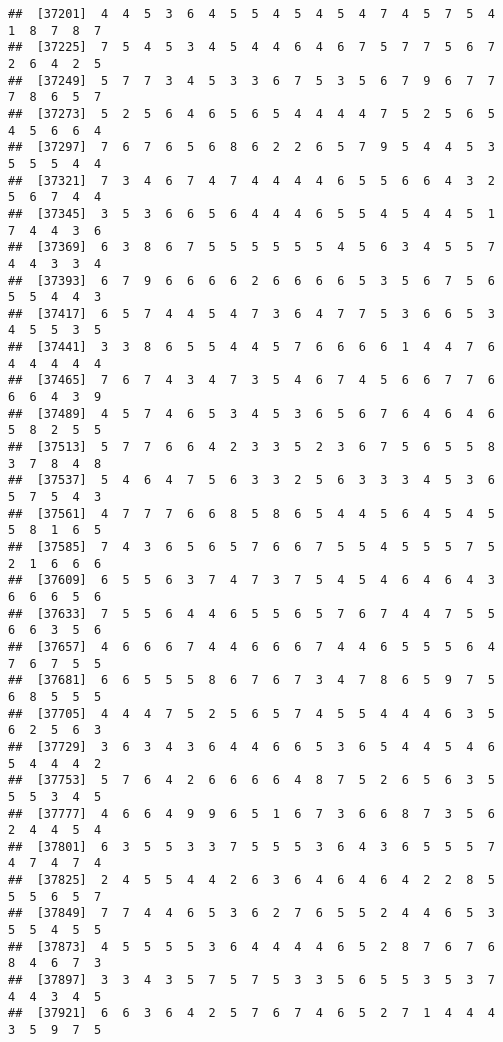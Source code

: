 \documentclass[
]{book}
\begin{document}
\begin{verbatim}
##  [37201]  4  4  5  3  6  4  5  5  4  5  4  5  4  7  4  5  7  5  4  1  8  7  8  7
##  [37225]  7  5  4  5  3  4  5  4  4  6  4  6  7  5  7  7  5  6  7  2  6  4  2  5
##  [37249]  5  7  7  3  4  5  3  3  6  7  5  3  5  6  7  9  6  7  7  7  8  6  5  7
##  [37273]  5  2  5  6  4  6  5  6  5  4  4  4  4  7  5  2  5  6  5  4  5  6  6  4
##  [37297]  7  6  7  6  5  6  8  6  2  2  6  5  7  9  5  4  4  5  3  5  5  5  4  4
##  [37321]  7  3  4  6  7  4  7  4  4  4  4  6  5  5  6  6  4  3  2  5  6  7  4  4
##  [37345]  3  5  3  6  6  5  6  4  4  4  6  5  5  4  5  4  4  5  1  7  4  4  3  6
##  [37369]  6  3  8  6  7  5  5  5  5  5  5  4  5  6  3  4  5  5  7  4  4  3  3  4
##  [37393]  6  7  9  6  6  6  6  2  6  6  6  6  5  3  5  6  7  5  6  5  5  4  4  3
##  [37417]  6  5  7  4  4  5  4  7  3  6  4  7  7  5  3  6  6  5  3  4  5  5  3  5
##  [37441]  3  3  8  6  5  5  4  4  5  7  6  6  6  6  1  4  4  7  6  4  4  4  4  4
##  [37465]  7  6  7  4  3  4  7  3  5  4  6  7  4  5  6  6  7  7  6  6  6  4  3  9
##  [37489]  4  5  7  4  6  5  3  4  5  3  6  5  6  7  6  4  6  4  6  5  8  2  5  5
##  [37513]  5  7  7  6  6  4  2  3  3  5  2  3  6  7  5  6  5  5  8  3  7  8  4  8
##  [37537]  5  4  6  4  7  5  6  3  3  2  5  6  3  3  3  4  5  3  6  5  7  5  4  3
##  [37561]  4  7  7  7  6  6  8  5  8  6  5  4  4  5  6  4  5  4  5  5  8  1  6  5
##  [37585]  7  4  3  6  5  6  5  7  6  6  7  5  5  4  5  5  5  7  5  2  1  6  6  6
##  [37609]  6  5  5  6  3  7  4  7  3  7  5  4  5  4  6  4  6  4  3  6  6  6  5  6
##  [37633]  7  5  5  6  4  4  6  5  5  6  5  7  6  7  4  4  7  5  5  6  6  3  5  6
##  [37657]  4  6  6  6  7  4  4  6  6  6  7  4  4  6  5  5  5  6  4  7  6  7  5  5
##  [37681]  6  6  5  5  5  8  6  7  6  7  3  4  7  8  6  5  9  7  5  6  8  5  5  5
##  [37705]  4  4  4  7  5  2  5  6  5  7  4  5  5  4  4  4  6  3  5  6  2  5  6  3
##  [37729]  3  6  3  4  3  6  4  4  6  6  5  3  6  5  4  4  5  4  6  5  4  4  4  2
##  [37753]  5  7  6  4  2  6  6  6  6  4  8  7  5  2  6  5  6  3  5  5  5  3  4  5
##  [37777]  4  6  6  4  9  9  6  5  1  6  7  3  6  6  8  7  3  5  6  2  4  4  5  4
##  [37801]  6  3  5  5  3  3  7  5  5  5  3  6  4  3  6  5  5  5  7  4  7  4  7  4
##  [37825]  2  4  5  5  4  4  2  6  3  6  4  6  4  6  4  2  2  8  5  5  5  6  5  7
##  [37849]  7  7  4  4  6  5  3  6  2  7  6  5  5  2  4  4  6  5  3  5  5  4  5  5
##  [37873]  4  5  5  5  5  3  6  4  4  4  4  6  5  2  8  7  6  7  6  8  4  6  7  3
##  [37897]  3  3  4  3  5  7  5  7  5  3  3  5  6  5  5  3  5  3  7  4  4  3  4  5
##  [37921]  6  6  3  6  4  2  5  7  6  7  4  6  5  2  7  1  4  4  4  3  5  9  7  5

\end{verbatim}
\end{document}
